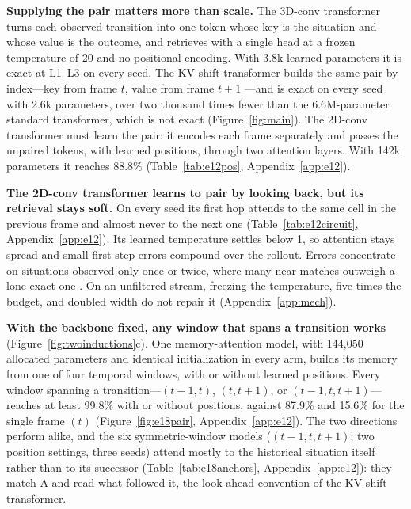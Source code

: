 \documentclass[11pt]{article}
\begin{document}
\textbf{Supplying the pair matters more than scale.} The 3D-conv transformer turns each observed transition into one token whose key is the situation and whose value is the outcome, and retrieves with a single head at a frozen temperature of 20 and no positional encoding. With 3.8k learned parameters it is exact at L1--L3 on every seed. The KV-shift transformer builds the same pair by index---key from frame $t$, value from frame $t{+}1$ \citep{lin2019tsm, peng2023rwkv}---and is exact on every seed with 2.6k parameters, over two thousand times fewer than the 6.6M-parameter standard transformer, which is not exact (Figure~\ref{fig:main}). The 2D-conv transformer must learn the pair: it encodes each frame separately and passes the unpaired tokens, with learned positions, through two attention layers. With 142k parameters it reaches 88.8\% (Table~\ref{tab:e12pos}, Appendix~\ref{app:e12}).

\textbf{The 2D-conv transformer learns to pair by looking back, but its retrieval stays soft.} On every seed its first hop attends to the same cell in the previous frame and almost never to the next one (Table~\ref{tab:e12circuit}, Appendix~\ref{app:e12}). Its learned temperature settles below 1, so attention stays spread and small first-step errors compound over the rollout. Errors concentrate on situations observed only once or twice, where many near matches outweigh a lone exact one \citep{singh2024needs, velickovic2024softmax}. On an unfiltered stream, freezing the temperature, five times the budget, and doubled width do not repair it (Appendix~\ref{app:mech}).

\textbf{With the backbone fixed, any window that spans a transition works} (Figure~\ref{fig:twoinductions}c). One memory-attention model, with 144{,}050 allocated parameters and identical initialization in every arm, builds its memory from one of four temporal windows, with or without learned positions. Every window spanning a transition---$(t{-}1,t)$, $(t,t{+}1)$, or $(t{-}1,t,t{+}1)$---reaches at least 99.8\% with or without positions, against 87.9\% and 15.6\% for the single frame $(t)$ (Figure~\ref{fig:e18pair}, Appendix~\ref{app:e12}). The two directions perform alike, and the six symmetric-window models ($(t{-}1,t,t{+}1)$; two position settings, three seeds) attend mostly to the historical situation itself rather than to its successor (Table~\ref{tab:e18anchors}, Appendix~\ref{app:e12}): they match A and read what followed it, the look-ahead convention of the KV-shift transformer.
\end{document}
